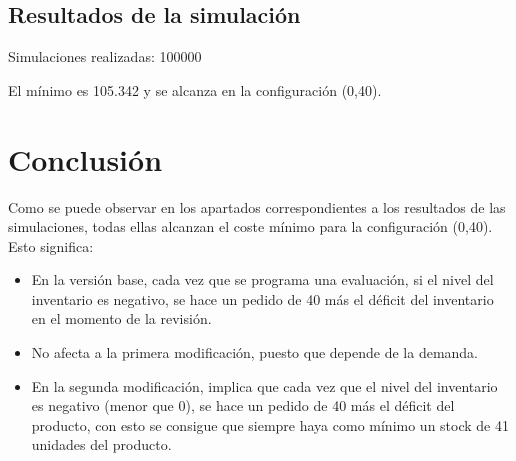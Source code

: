 \subsection{Resultados de la simulación}
Simulaciones realizadas: 100000
\begin{table}[H]
\centering
{}
\end{table}

El	mínimo es 105.342 y se alcanza en la configuración (0,40).

\newpage

\section{Conclusión}

Como se puede observar en los apartados correspondientes a los resultados de las simulaciones, todas ellas alcanzan el coste mínimo para la configuración (0,40).
Esto significa:
\begin{itemize}
	\item En la versión base, cada vez que se programa una evaluación, si el nivel del inventario es negativo, se hace un pedido de 40 más el déficit del inventario en el momento de la revisión.
	\item No afecta a la primera modificación, puesto que depende de la demanda.
	\item En la segunda modificación, implica que cada vez que el nivel del inventario es negativo (menor que 0), se hace un pedido de 40 más el déficit del producto, con esto se consigue que siempre haya como mínimo un stock de 41 unidades del producto.
\end{itemize}

